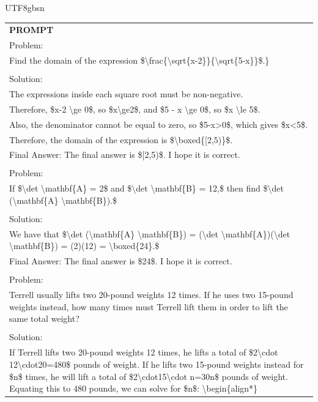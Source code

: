 \documentclass[11pt, a4paper, logo, copyright, nonumbering]{deepseek}
\begin{document}
\begin{CJK*}{UTF8}{gbsn}
\begin{table}[h]
    \centering \small
\begin{tabular}{p{12cm}}
\toprule
\textbf{PROMPT}\\
Problem:
\\Find the domain of the expression \$\textbackslash frac\{\textbackslash sqrt\{x-2\}\}\{\textbackslash sqrt\{5-x\}\}\$.\}
\\
\\Solution:
\\The expressions inside each square root must be non-negative.
\\Therefore, \$x-2 \textbackslash ge 0\$, so \$x\textbackslash ge2\$, and \$5 - x \textbackslash ge 0\$, so \$x \textbackslash le 5\$.
\\Also, the denominator cannot be equal to zero, so \$5-x>0\$, which gives \$x<5\$.
\\Therefore, the domain of the expression is \$\textbackslash boxed\{[2,5)\}\$.
\\Final Answer: The final answer is \$[2,5)\$. I hope it is correct.
\\
\\Problem:
\\If \$\textbackslash det \textbackslash mathbf\{A\} = 2\$ and \$\textbackslash det \textbackslash mathbf\{B\} = 12,\$ then find \$\textbackslash det (\textbackslash mathbf\{A\} \textbackslash mathbf\{B\}).\$
\\
\\Solution:
\\We have that \$\textbackslash det (\textbackslash mathbf\{A\} \textbackslash mathbf\{B\}) = (\textbackslash det \textbackslash mathbf\{A\})(\textbackslash det \textbackslash mathbf\{B\}) = (2)(12) = \textbackslash boxed\{24\}.\$
\\Final Answer: The final answer is \$24\$. I hope it is correct.
\\
\\Problem:
\\Terrell usually lifts two 20-pound weights 12 times. If he uses two 15-pound weights instead, how many times must Terrell lift them in order to lift the same total weight?
\\
\\Solution:
\\If Terrell lifts two 20-pound weights 12 times, he lifts a total of \$2\textbackslash cdot 12\textbackslash cdot20=480\$ pounds of weight.  If he lifts two 15-pound weights instead for \$n\$ times, he will lift a total of \$2\textbackslash cdot15\textbackslash cdot n=30n\$ pounds of weight.  Equating this to 480 pounds, we can solve for \$n\$: \textbackslash begin\{align*\}

\end{tabular}
\end{table}
\end{CJK*}
\end{document}
